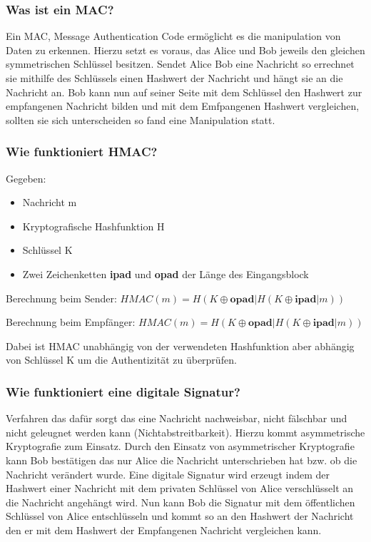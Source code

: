 	\subsubsection{Was ist ein MAC?}
	Ein MAC, Message Authentication Code ermöglicht es die manipulation von Daten zu erkennen. Hierzu setzt es voraus, das Alice und Bob jeweils den gleichen symmetrischen Schlüssel besitzen. Sendet Alice Bob eine Nachricht so errechnet sie mithilfe des Schlüssels einen Hashwert der Nachricht und hängt sie an die Nachricht an. Bob kann nun auf seiner Seite mit dem Schlüssel den Hashwert zur empfangenen Nachricht bilden und mit dem Emfpangenen Hashwert vergleichen, sollten sie sich unterscheiden so fand eine Manipulation statt.
	
	\subsubsection{Wie funktioniert HMAC?}
	Gegeben: 
	\begin{itemize}
		\item Nachricht m
		\item Kryptografische Hashfunktion H
		\item Schlüssel K
		\item Zwei Zeichenketten \textbf{ipad} und \textbf{opad} der Länge des Eingangsblock
	\end{itemize}
	
	Berechnung beim Sender: $HMAC(m) = H(K \oplus \textbf{opad} | H(K \oplus \textbf{ipad}|m))$
	
	
	Berechnung beim Empfänger: $HMAC(m) = H(K \oplus \textbf{opad} | H(K \oplus \textbf{ipad} |m))$
	
	Dabei ist HMAC unabhängig von der verwendeten Hashfunktion aber abhängig von Schlüssel K um die Authentizität zu überprüfen.
	
	\subsubsection{Wie funktioniert eine digitale Signatur?}
	Verfahren das dafür sorgt das eine Nachricht nachweisbar, nicht fälschbar und nicht geleugnet werden kann (Nichtabstreitbarkeit). Hierzu kommt asymmetrische Kryptografie zum Einsatz. Durch den Einsatz von asymmetrischer Kryptografie kann Bob bestätigen das nur Alice die Nachricht unterschrieben hat bzw. ob die Nachricht verändert wurde.
	Eine digitale Signatur wird erzeugt indem der Hashwert einer Nachricht mit dem privaten Schlüssel von Alice verschlüsselt an die Nachricht angehängt wird. Nun kann Bob die Signatur mit dem öffentlichen Schlüssel von Alice entschlüsseln und kommt so an den Hashwert der Nachricht den er mit dem Hashwert der Empfangenen Nachricht vergleichen kann.
	
